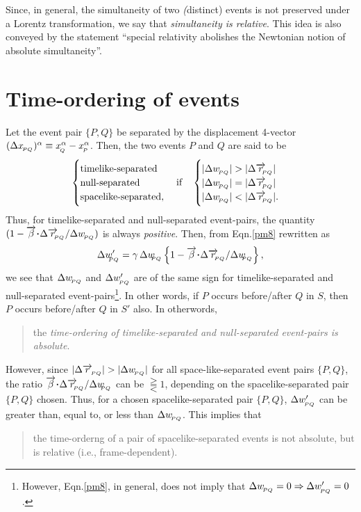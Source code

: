 Since, in general, the simultaneity of two 
\textsl(distinct) 
events is not preserved under a Lorentz transformation, 
we 
say that  \textsl{simultaneity is relative}. This idea 
is 
also conveyed by the statement ``{special relativity 
abolishes the Newtonian notion of absolute 
simultaneity}''.

\section{Time-ordering of events}

Let the event pair $\{P,Q \}$  be separated by the 
displacement  4-vector $(\Delta x_{_{\hspace*{-1.5pt}{PQ}}})^{{\alpha}} 
\equiv 
x_{_{\hspace*{-1.5pt}{Q}}}^{{\alpha}}-x_{_{\hspace*{-1.5pt}{P}}}^{{\alpha}}$.  Then, 
\dfn the two events $P$ and $Q$ are said to be 
\begin{align}\label{pmx9}
\begin{cases}\text{timelike-separated} \\
\text{null-separated} \\
\text{spacelike-separated},\end{cases}
\text{if} \quad \begin{cases}
|\Delta w_\sfx{PQ}| >  |\Delta  \veca{r}_\sfx{\nnt 
PQ}|\\
|\Delta w_\sfx{PQ}| = |\Delta  \veca{r}_\sfx{\nnt 
PQ}|\\
|\Delta w_\sfx{PQ}|< |\Delta  \veca{r}_\sfx{\nnt PQ}|.
\end{cases}
\end{align}
Thus, for timelike-separated and null-separated 
event-pairs, 
the quantity $(1-\veca{\gkb}\dotp\Delta 
\veca{r}_\sfx{\nnt 
PQ} 
/\Delta w_\sfx{PQ})$ is always \textsl{positive}.  
Then, 
from Eqn.\eqref{pm8} rewritten as
\begin{align}\label{pmx10}
 \Delta w'_\sfx{\nnt PQ}=\gkg\,\Delta w_\sfx{\nnt PQ}
\left\{1-\veca{\gkb}
\dotp\Delta  \veca{r}_\sfx{\nnt PQ}/\Delta w_\sfx{\nnt 
PQ}\right\},
\end{align}
we see that $\Delta w_{_{\hspace*{-1.5pt}{PQ}}}$ and  $\Delta 
w'_{_{\hspace*{-1.5pt}{PQ}}}$ 
{are of the same sign for  timelike-separated and 
null-separated event-pairs}\footnote{However, 
Eqn.\eqref{pm8}, in general, does not imply that 
$\Delta 
w_{_{\hspace*{-1.5pt}{PQ}}}=0 \Rightarrow \Delta w'_{_{\hspace*{-1.5pt}{PQ}}}=0$.}. In  
other 
words, if $P$ occurs before/after $Q$ in $S$, then $P$ 
occurs before/after $Q$ in $S'$ also. In otherwords,
\begin{quote}
the  \textsl{time-ordering of timelike-separated and  
null-separated event-pairs is absolute}.
\end{quote}
However,  since $|\Delta \veca{r}_\sfx{PQ}|>|\Delta 
w_\sfx{PQ}|$ for all space-like-separated event pairs 
$\{P,Q\}$, the ratio $\veca{\gkb} \dotp\Delta  
\veca{r}_\sfx{\nnt PQ}/\Delta w_\sfx{\nnt PQ}$  can be 
$\gtreqqless 1$, depending on the spacelike-separated  
pair 
$\{P,Q\}$ chosen. Thus, for a chosen 
spacelike-separated  
pair $\{P,Q\}$, $\Delta w'_{_{\hspace*{-1.5pt}{PQ}}}$ can be greater 
than, 
equal to, or less than   $\Delta w_{_{\hspace*{-1.5pt}{PQ}}}$. This 
implies 
that  
\begin{quote}
the time-orderng of a pair of spacelike-separated 
events is 
not absolute, but is relative (i.e., frame-dependent).
\end{quote}

